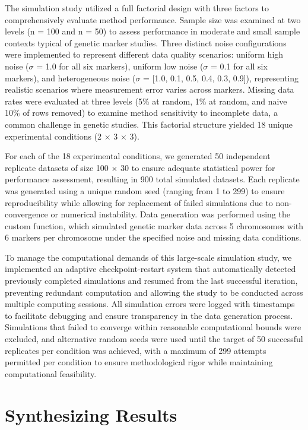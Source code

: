 \documentclass[
  12pt,
]{article}
\begin{document}
The simulation study utilized a full factorial design with three factors
to comprehensively evaluate method performance. Sample size was examined
at two levels (n = 100 and n = 50) to assess performance in moderate and
small sample contexts typical of genetic marker studies. Three distinct
noise configurations were implemented to represent different data
quality scenarios: uniform high noise (\(\sigma\) = 1.0 for all six markers),
uniform low noise (\(\sigma\) = 0.1 for all six markers), and heterogeneous noise
(\(\sigma\) = {[}1.0, 0.1, 0.5, 0.4, 0.3, 0.9{]}), representing realistic
scenarios where measurement error varies across markers. Missing data
rates were evaluated at three levels (5\% at random, 1\% at random, and
naive 10\% of rows removed) to examine method sensitivity to incomplete
data, a common challenge in genetic studies. This factorial structure
yielded 18 unique experimental conditions (2 × 3 × 3).

For each of the 18 experimental conditions, we generated 50 independent
replicate datasets of size 100 × 30 to ensure adequate statistical power
for performance assessment, resulting in 900 total simulated datasets.
Each replicate was generated using a unique random seed (ranging from 1
to 299) to ensure reproducibility while allowing for replacement of
failed simulations due to non-convergence or numerical instability. Data
generation was performed using the custom function, which simulated
genetic marker data across 5 chromosomes with 6 markers per chromosome
under the specified noise and missing data conditions.

To manage the computational demands of this large-scale simulation
study, we implemented an adaptive checkpoint-restart system that
automatically detected previously completed simulations and resumed from
the last successful iteration, preventing redundant computation and
allowing the study to be conducted across multiple computing sessions.
All simulation errors were logged with timestamps to facilitate
debugging and ensure transparency in the data generation process.
Simulations that failed to converge within reasonable computational
bounds were excluded, and alternative random seeds were used until the
target of 50 successful replicates per condition was achieved, with a
maximum of 299 attempts permitted per condition to ensure methodological
rigor while maintaining computational feasibility.

\section{Synthesizing Results}
\end{document}
